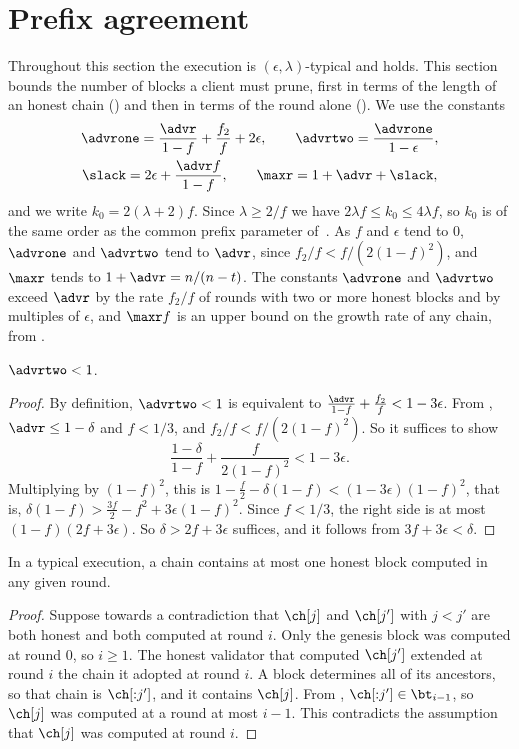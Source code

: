 \section{Prefix agreement}
\label{sec.analysis}

Throughout this section the execution is $(\epsilon,\lambda)$-typical and
 holds. This section bounds the number of blocks a client
must prune, first in terms of the length of an honest chain
() and then in terms of the round alone ().
We use the constants
\begin{gather*}
    \advrone = \frac{\advr}{1-f} + \frac{f_2}{f} + 2\epsilon, \qquad
    \advrtwo = \frac{\advrone}{1-\epsilon}, \\
    \slack = 2\epsilon + \frac{\advr f}{1-f}, \qquad
    \maxr = 1 + \advr + \slack,
\end{gather*}
and we write $k_0 = 2(\lambda + 2)f$. Since $\lambda \geq 2 / f$ we have
$2\lambda f \leq k_0 \leq 4\lambda f$, so $k_0$ is of the same order as the
common prefix parameter of~\cite{gkl24}. As $f$ and $\epsilon$ tend to $0$,
$\advrone$ and $\advrtwo$ tend to $\advr$, since $f_2/f<f/(2(1-f)^2)$, and $\maxr$
tends to $1 + \advr = n / (n - t)$. The constants $\advrone$ and $\advrtwo$
exceed $\advr$ by the rate $f_2/f$ of rounds with two or more honest blocks
and by multiples of $\epsilon$, and $\maxr f$ is an upper bound on the growth
rate of any chain, from .

\begin{lemma}\label{lem.rho}
    $\advrtwo<1$.
\end{lemma}
\begin{proof}
    By definition, $\advrtwo<1$ is equivalent to
    $\frac{\advr}{1-f}+\frac{f_2}{f}<1-3\epsilon$. From ,
    $\advr\le1-\delta$ and $f<1/3$, and $f_2/f<f/(2(1-f)^2)$. So it suffices to
    show
    \[
        \frac{1-\delta}{1-f}+\frac{f}{2(1-f)^2} < 1-3\epsilon .
    \]
    Multiplying by $(1-f)^2$, this is
    $1-\tfrac{f}{2}-\delta(1-f)<(1-3\epsilon)(1-f)^2$, that is,
    $\delta(1-f)>\tfrac{3f}{2}-f^2+3\epsilon(1-f)^2$. Since $f<1/3$, the right
    side is at most $(1-f)(2f+3\epsilon)$. So $\delta>2f+3\epsilon$ suffices,
    and it follows from $3f+3\epsilon<\delta$.
\end{proof}

\begin{lemma}\label{lem.honestone}
    In a typical execution, a chain contains at most one honest block computed
    in any given round.
\end{lemma}
\begin{proof}
    Suppose towards a contradiction that $\ch[j]$ and $\ch[j']$ with $j<j'$ are
    both honest and both computed at round $i$. Only the genesis block was
    computed at round $0$, so $i\ge1$. The honest validator that computed $\ch[j']$ extended at round $i$ the chain it adopted at round $i$.
    A block determines all of its ancestors, so that chain is $\ch[{:}j']$, and
    it contains $\ch[j]$. From , $\ch[{:}j']\in\bt_{i-1}$,
    so $\ch[j]$ was computed at a round at most $i-1$. This contradicts the
    assumption that $\ch[j]$ was computed at round $i$.
\end{proof}

